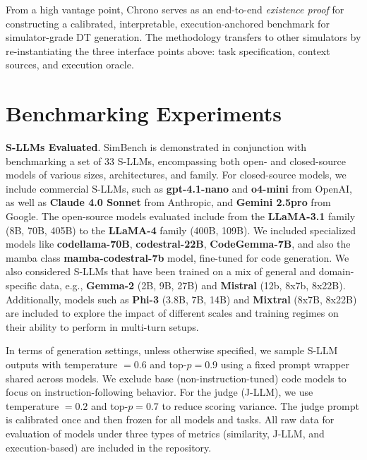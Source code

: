 \documentclass{ieeeaccess}
\begin{document}
From a high vantage point, Chrono serves as an end-to-end \emph{existence proof} for constructing a calibrated, interpretable, execution-anchored benchmark for simulator-grade DT generation. The methodology transfers to other simulators by re-instantiating the three interface points above: task specification, context sources, and execution oracle.
 


\section{Benchmarking Experiments}
\label{sec:exp}
\textbf{S-LLMs Evaluated}. SimBench is demonstrated in conjunction with benchmarking a set of 33 S-LLMs,
encompassing both open- and closed-source models of various sizes, architectures, and family.
For closed-source models, we include commercial S-LLMs, such as \textbf{gpt-4.1-nano} and \textbf{o4-mini}
from OpenAI, as well as \textbf{Claude 4.0 Sonnet} from Anthropic, and \textbf{Gemini 2.5pro} from Google.
The open-source models evaluated include from the \textbf{LLaMA-3.1} family (8B, 70B, 405B) to the \textbf{LLaMA-4} family (400B, 109B).
We included specialized models like \textbf{codellama-70B}, \textbf{codestral-22B}, \textbf{CodeGemma-7B}, and also the mamba class \textbf{mamba-codestral-7b} model,
fine-tuned for code generation. We also considered S-LLMs that have been trained on a mix of general and 
domain-specific data, e.g., \textbf{Gemma-2} (2B, 9B, 27B) and \textbf{Mistral} (12b, 8x7b, 8x22B). 
Additionally, models such as \textbf{Phi-3} (3.8B, 7B, 14B) and \textbf{Mixtral} (8x7B, 8x22B) 
are included to explore the impact of different scales and training regimes on their ability to perform in 
multi-turn setups. 

In terms of generation settings, unless otherwise specified, we sample S-LLM outputs with temperature $=0.6$ and top-$p=0.9$ using a fixed prompt wrapper shared across models. We exclude base (non-instruction-tuned) code models to focus on instruction-following behavior. For the judge (J-LLM), we use temperature $=0.2$ and top-$p=0.7$ to reduce scoring variance. The judge prompt is calibrated once and then frozen for all models and tasks. All raw data for evaluation of models under three types of metrics (similarity, J-LLM, and execution-based) are included in the repository.
\end{document}
